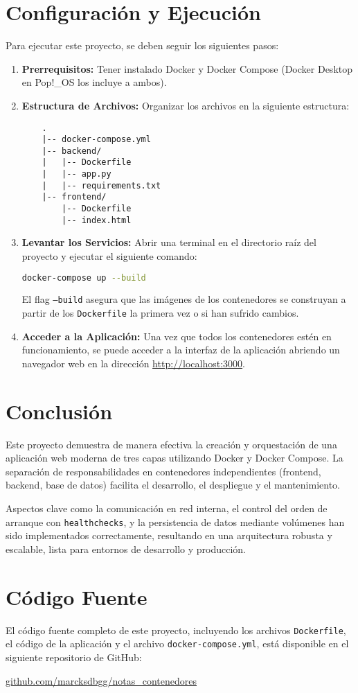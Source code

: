 \documentclass[12pt, a4paper]{article}
\begin{document}
\section{Configuración y Ejecución}
Para ejecutar este proyecto, se deben seguir los siguientes pasos:

\begin{enumerate}
    \item \textbf{Prerrequisitos:} Tener instalado Docker y Docker Compose (Docker Desktop en Pop!\_OS los incluye a ambos).
    \item \textbf{Estructura de Archivos:} Organizar los archivos en la siguiente estructura:
    \begin{verbatim}
    .
    |-- docker-compose.yml
    |-- backend/
    |   |-- Dockerfile
    |   |-- app.py
    |   |-- requirements.txt
    |-- frontend/
        |-- Dockerfile
        |-- index.html
    \end{verbatim}
    \item \textbf{Levantar los Servicios:} Abrir una terminal en el directorio raíz del proyecto y ejecutar el siguiente comando:
    \begin{lstlisting}[language=bash, numbers=none]
docker-compose up --build
    \end{lstlisting}
    El flag \texttt{--build} asegura que las imágenes de los contenedores se construyan a partir de los \texttt{Dockerfile} la primera vez o si han sufrido cambios.
    \item \textbf{Acceder a la Aplicación:} Una vez que todos los contenedores estén en funcionamiento, se puede acceder a la interfaz de la aplicación abriendo un navegador web en la dirección \href{http://localhost:3000}{http://localhost:3000}.
\end{enumerate}

\section{Conclusión}
Este proyecto demuestra de manera efectiva la creación y orquestación de una aplicación web moderna de tres capas utilizando Docker y Docker Compose. La separación de responsabilidades en contenedores independientes (frontend, backend, base de datos) facilita el desarrollo, el despliegue y el mantenimiento.

Aspectos clave como la comunicación en red interna, el control del orden de arranque con \texttt{healthchecks}, y la persistencia de datos mediante volúmenes han sido implementados correctamente, resultando en una arquitectura robusta y escalable, lista para entornos de desarrollo y producción.

\section{Código Fuente}
El código fuente completo de este proyecto, incluyendo los archivos \texttt{Dockerfile}, el código de la aplicación y el archivo \texttt{docker-compose.yml}, está disponible en el siguiente repositorio de GitHub:
\begin{center}
    \href{https://github.com/marcksdbgg/notas_contenedores}{github.com/marcksdbgg/notas\_contenedores}
\end{center}
\end{document}
